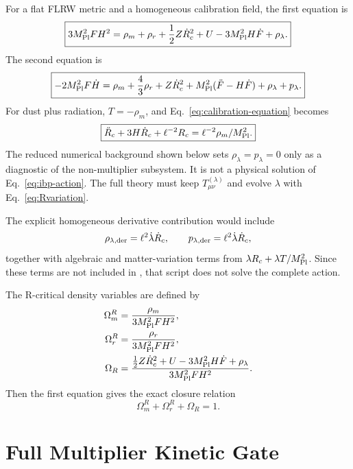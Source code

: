 \documentclass[12pt,a4paper]{article}
\DeclareRobustCommand{\codepath}[1]{\path{#1}}
\begin{document}
For a flat FLRW metric and a homogeneous calibration field, the first equation is
\begin{equation}
\boxed{
3M_{\rm Pl}^2F H^2
=\rho_m+\rho_r+\frac12Z\dot R_c^2+U
-3M_{\rm Pl}^2H\dot F+\rho_\lambda.
}
\label{eq:friedmann1locked}
\end{equation}
The second equation is
\begin{equation}
\boxed{
-2M_{\rm Pl}^2F\dot H
=\rho_m+\frac43\rho_r+Z\dot R_c^2
+M_{\rm Pl}^2(\ddot F-H\dot F)+\rho_\lambda+p_\lambda.
}
\label{eq:friedmann2locked}
\end{equation}
For dust plus radiation, $T=-\rho_m$, and Eq.~\eqref{eq:calibration-equation} becomes
\begin{equation}
\boxed{\ddot R_c+3H\dot R_c+\ell^{-2}R_c=\ell^{-2}\rho_m/M_{\rm Pl}^2.}
\label{eq:Rflrw}
\end{equation}
The reduced numerical background shown below sets $\rho_\lambda=p_\lambda=0$ only as a diagnostic of the non-multiplier subsystem. It is not a physical solution of Eq.~\eqref{eq:ibp-action}. The full theory must keep $T_{\mu\nu}^{(\lambda)}$ and evolve $\lambda$ with Eq.~\eqref{eq:Rvariation}.

The explicit homogeneous derivative contribution would include
\begin{equation}
\rho_{\lambda,{\rm der}}=\ell^2\dot\lambda\dot R_c,
\qquad
p_{\lambda,{\rm der}}=\ell^2\dot\lambda\dot R_c,
\label{eq:lambdader-rhop}
\end{equation}
together with algebraic and matter-variation terms from $\lambda R_c+\lambda T/M_{\rm Pl}^2$. Since these terms are not included in \codepath{code/locked_r_universe.py}, that script does not solve the complete action.

The R-critical density variables are defined by
\begin{align}
\Omega_m^R&=\frac{\rho_m}{3M_{\rm Pl}^2F H^2},\label{eq:OmmR}\\
\Omega_r^R&=\frac{\rho_r}{3M_{\rm Pl}^2F H^2},\label{eq:OmrR}\\
\Omega_R&=\frac{\frac12Z\dot R_c^2+U-3M_{\rm Pl}^2H\dot F+\rho_\lambda}{3M_{\rm Pl}^2F H^2}.
\label{eq:OmcalR}
\end{align}
Then the first equation gives the exact closure relation
\begin{equation}
\boxed{\Omega_m^R+\Omega_r^R+\Omega_R=1.}
\label{eq:Rclosure}
\end{equation}


\section{Full Multiplier Kinetic Gate}
\end{document}
